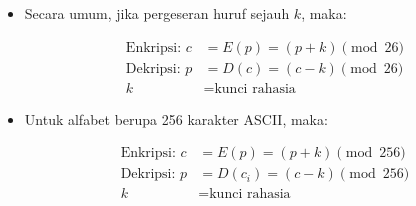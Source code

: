 \documentclass{article}
\begin{document}

\begin{itemize}
    \item Secara umum, jika pergeseran huruf sejauh $k$, maka:
    
    \begin{align*}
    \text{Enkripsi: } c &= E(p) = (p + k) \pmod{26} \\
    \text{Dekripsi: } p &= D(c) = (c - k) \pmod{26} \\
    k &= \text{kunci rahasia}
    \end{align*}
    
    \item Untuk alfabet berupa 256 karakter ASCII, maka:
    
    \begin{align*}
    \text{Enkripsi: } c &= E(p) = (p + k) \pmod{256} \\
    \text{Dekripsi: } p &= D(c_i) = (c - k) \pmod{256} \\
    k &= \text{kunci rahasia}
    \end{align*}
\end{itemize}
\end{document}
